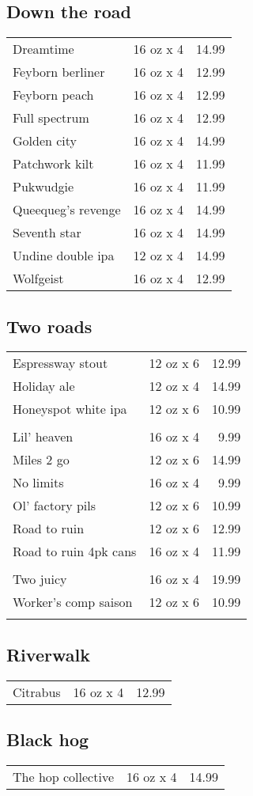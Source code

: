 \documentclass{article}%
\begin{document}
\begin{multicols}{3}
%
\subsection*{Down the road}%
\begin{tabular}{l c r}%
Dreamtime&16 oz x 4&14.99\\%
Feyborn berliner&16 oz x 4&12.99\\%
Feyborn peach&16 oz x 4&12.99\\%
Full spectrum&16 oz x 4&12.99\\%
Golden city&16 oz x 4&14.99\\%
Patchwork kilt&16 oz x 4&11.99\\%
Pukwudgie&16 oz x 4&11.99\\%
Queequeg's revenge&16 oz x 4&14.99\\%
Seventh star&16 oz x 4&14.99\\%
Undine double ipa&12 oz x 4&14.99\\%
Wolfgeist&16 oz x 4&12.99\\%
\end{tabular}

%
\subsection*{Two roads}%
\begin{tabular}{l c r}%
Espressway stout&12 oz x 6&12.99\\%
Holiday ale&12 oz x 4&14.99\\%
\multirow{1}{15ex}{Honeyspot white ipa}&12 oz x 6&10.99\\%
&&\\%
Lil' heaven&16 oz x 4&9.99\\%
Miles 2 go&12 oz x 6&14.99\\%
No limits&16 oz x 4&9.99\\%
Ol' factory pils&12 oz x 6&10.99\\%
Road to ruin&12 oz x 6&12.99\\%
\multirow{1}{15ex}{Road to ruin 4pk cans}&16 oz x 4&11.99\\%
&&\\%
Two juicy&16 oz x 4&19.99\\%
\multirow{1}{15ex}{Worker's comp saison}&12 oz x 6&10.99\\%
&&\\%
\end{tabular}

%
\subsection*{Riverwalk}%
\begin{tabular}{l c r}%
Citrabus&16 oz x 4&12.99\\%
\end{tabular}

%
\subsection*{Black hog}%
\begin{tabular}{l c r}%
The hop collective&16 oz x 4&14.99\\%
\end{tabular}

%
\end{multicols}%
\end{document}
